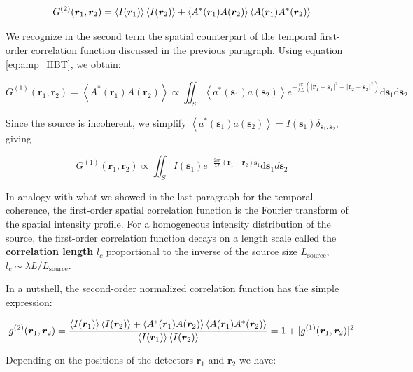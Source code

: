 \begin{equation}
     G^{(2)} (\bm{r}_1,\bm{r}_2) = \left\langle I(\bm{r}_1)\right\rangle \left\langle I(\bm{r}_2)\right\rangle + \left\langle A^*(\bm{r}_1) A(\bm{r}_2)\right\rangle \left\langle A(\bm{r}_1) A^*(\bm{r}_2)\right\rangle
\end{equation}

We recognize in the second term the spatial counterpart of the temporal first-order correlation function discussed in the previous paragraph. Using equation \ref{eq:amp_HBT}, we obtain:

\begin{equation}
    G^{(1)}\left(\bm{r}_{1}, \bm{r}_{2}\right)=\left\langle A^*(\bm{r}_1) A(\bm{r}_2)\right\rangle \propto \iint_{S}\left\langle a^{*}(\bm{s}_1) a(\bm{s}_2)\right\rangle e^{-\frac{i \pi}{\lambda L}\left(\left|\bm{r}_{1}-\bm{s}_1\right|^{2}-\left|\bm{r}_{2}-\bm{s}_2\right|^{2}\right)} \mathrm{d} \bm{s}_1 \mathrm{d} \bm{s}_2
\end{equation}

Since the source is incoherent, we simplify $\left\langle a^{*}(\bm{s}_1) a(\bm{s}_2)\right\rangle = I(\bm{s}_1) \delta_{\bm{s}_1,\bm{s}_2}$, giving

\begin{equation}
    G^{(1)}\left(\bm{r}_{1}, \bm{r}_{2}\right) \propto \iint_{S} I(\bm{s}_1) e^{-\frac{2 i \pi}{\lambda L}\left(\bm{r}_{1}-\bm{r}_{2}\right) \bm{s}_1} \mathrm{d} \bm{s}_1 d \bm{s}_2
\end{equation}

In analogy with what we showed in the last paragraph for the temporal coherence, the first-order spatial correlation function is the Fourier transform of the spatial intensity profile. For a homogeneous intensity distribution of the source, the first-order correlation function decays on a length scale called the \textbf{correlation length} $l_c$ proportional to the inverse of the source size $L_{\mathrm{source}}$, $l_c \sim \lambda L / L_{\mathrm{source}}$.

In a nutshell, the second-order normalized correlation function has the simple expression:

\begin{equation}
    g^{(2)} (\bm{r}_1,\bm{r}_2) = \frac{\left\langle I(\bm{r}_1)\right\rangle \left\langle I(\bm{r}_2)\right\rangle + \left\langle A^*(\bm{r}_1) A(\bm{r}_2)\right\rangle \left\langle A(\bm{r}_1) A^*(\bm{r}_2)\right\rangle}{\left\langle I(\bm{r}_1)\right\rangle\left\langle I(\bm{r}_2)\right\rangle} = 1 + |g^{(1)}(\bm{r}_1,\bm{r}_2)|^2
\end{equation}

Depending on the positions of the detectors $\bm{r}_1$ and $\bm{r}_2$ we have:

